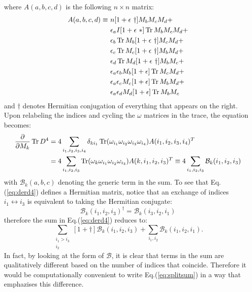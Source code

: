 \documentclass[12pt,a4paper]{article}
\DeclareMathOperator{\Tr}{Tr}
\begin{document}
where $A(a, b, c, d )$ is the following $n \times n$ matrix:
\begin{align}
A(a,b,c,d) \equiv \ &n [1+\epsilon \ \dagger] M_b M_c M_d + \notag \\
&\epsilon_a I [1 + \epsilon \ *] \Tr M_b M_c M_d  + \notag \\
&\epsilon_b \Tr M_b [1 + \epsilon \ \dagger] M_c M_d + \notag \\
&\epsilon_c \Tr M_c [1 + \epsilon \ \dagger] M_b M_d + \notag \\
&\epsilon_d \Tr M_d [1 + \epsilon \ \dagger] M_b M_c + \notag \\
&\epsilon_a \epsilon_b M_b [1 + \epsilon] \Tr M_c M_d + \notag \\
&\epsilon_a \epsilon_c M_c [1 + \epsilon] \Tr M_b M_d + \notag \\
&\epsilon_a \epsilon_d M_d [1 + \epsilon] \Tr M_b M_c
\end{align}
and $\dagger$ denotes Hermitian conjugation of everything that appears on the right. Upon relabeling the indices and cycling the $\omega$ matrices in the trace, the equation becomes:
\begin{align}\label{eq:derd4}
\frac{\partial}{\partial M_k} \Tr D^4 &= 4 \sum_{i_1, i_2, i_3, i_4} \delta_{ki_1} \Tr (\omega_{i_1} \omega_{i_2} \omega_{i_3} \omega_{i_4}) A(i_1, i_2, i_3, i_4)^T \notag \\
&= 4 \sum_{i_1, i_2, i_3} \Tr (\omega_{k} \omega_{i_1} \omega_{i_2} \omega_{i_3}) A(k, i_1, i_2, i_3)^T \equiv 4 \sum_{i_1, i_2, i_3} \mathcal{B}_k(i_1, i_2, i_3)
\end{align}
with $\mathcal{B}_k(a, b, c)$ denoting the generic term in the sum.\newline
To see that Eq.(\ref{eq:derd4}) defines a Hermitian matrix, notice that an exchange of indices $i_1 \leftrightarrow i_3$ is equivalent to taking the Hermitian conjugate:
\begin{equation}\label{eq:BBd}
\mathcal{B}_k(i_1, i_2, i_3)^{\dagger} = \mathcal{B}_k(i_3, i_2, i_1)
\end{equation}
therefore the sum in Eq.(\ref{eq:derd4}) reduces to:
\begin{equation}\label{eq:splitsum}
\sum_{\substack{i_1 > i_3 \\ i_2}} [1+\dagger] \mathcal{B}_k(i_1, i_2, i_3) + \sum_{i_1, i_2} \mathcal{B}_k(i_1, i_2, i_1).
\end{equation}
In fact, by looking at the form of $\mathcal{B}$, it is clear that terms in the sum are qualitatively different based on the number of indices that coincide. Therefore it would be computationally convenient to write Eq.(\ref{eq:splitsum}) in a way that emphazises this difference.\newline
\end{document}
